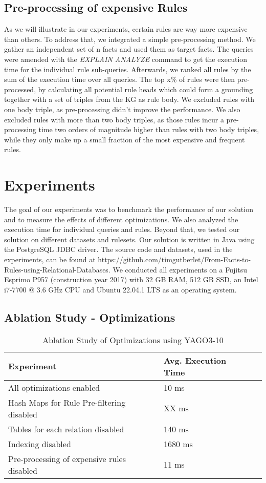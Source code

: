 \documentclass[english]{lni}
\begin{document}
\subsection{Pre-processing of expensive Rules}
As we will illustrate in our experiments, certain rules are way more expensive than others. To address that, we integrated a simple pre-processing method. We gather an independent set of n facts and used them as target facts. The queries were amended with the \textit{EXPLAIN ANALYZE} command to get the execution time for the individual rule sub-queries. Afterwards, we ranked all rules by the sum of the execution time over all queries. The top x\% of rules were then pre-processed, by calculating all potential rule heads which could form a grounding together with a set of triples from the KG as rule body. We excluded rules with one body triple, as pre-processing didn’t improve the performance. We also excluded rules with more than two body triples, as those rules incur a pre-processing time two orders of magnitude higher than rules with two body triples, while they only make up a small fraction of the most expensive and frequent rules.


\section{Experiments}
The goal of our experiments was to benchmark the performance of our solution and to measure the effects of different optimizations. We also analyzed the execution time for individual queries and rules. Beyond that, we tested our solution on different datasets and rulesets. Our solution is written in Java using the PostgreSQL JDBC driver. The source code and datasets, used in the experiments, can be found at https://github.com/timgutberlet/From-Facts-to-Rules-using-Relational-Databases. We conducted all experiments on a Fujitsu Esprimo P957 (construction year 2017) with 32 GB RAM, 512 GB SSD, an Intel i7-7700 @ 3.6 GHz CPU and Ubuntu 22.04.1 LTS as an operating system.

\subsection{Ablation Study - Optimizations} 

\begin{table}
\centering
\begin{tabular}{lll}
\toprule
Experiment & Avg. Execution Time \\
\midrule
All optimizations enabled & 10 ms\\
\midrule
Hash Maps for Rule Pre-filtering disabled & XX ms\\
Tables for each relation disabled & 140 ms\\
Indexing disabled & 1680 ms\\
Pre-processing of expensive rules disabled & 11 ms\\

\bottomrule
\end{tabular}
\caption{Ablation Study of Optimizations using YAGO3-10}
\label{tab:ablation}
\end{table}
\end{document}
